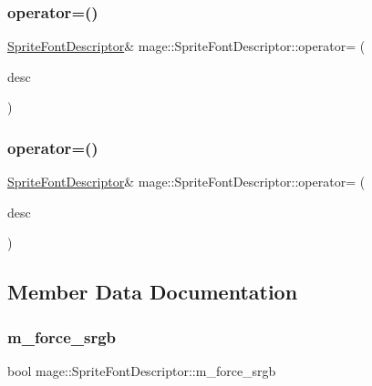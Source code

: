 \hypertarget{structmage_1_1_sprite_font_descriptor_a2279d65420bd8230a334c4ceb560fcf6}{}\label{structmage_1_1_sprite_font_descriptor_a2279d65420bd8230a334c4ceb560fcf6} 
\subsubsection{\texorpdfstring{operator=()}{operator=()}\hspace{0.1cm}{\footnotesize\ttfamily [1/2]}}
{\footnotesize\ttfamily \hyperlink{structmage_1_1_sprite_font_descriptor}{Sprite\+Font\+Descriptor}\& mage\+::\+Sprite\+Font\+Descriptor\+::operator= (\begin{DoxyParamCaption}\item[{const \hyperlink{structmage_1_1_sprite_font_descriptor}{Sprite\+Font\+Descriptor} \&}]{desc }\end{DoxyParamCaption})\hspace{0.3cm}{\ttfamily [default]}}

\hypertarget{structmage_1_1_sprite_font_descriptor_a4d7c7df43f32819446f35ef71f49ebac}{}\label{structmage_1_1_sprite_font_descriptor_a4d7c7df43f32819446f35ef71f49ebac} 
\subsubsection{\texorpdfstring{operator=()}{operator=()}\hspace{0.1cm}{\footnotesize\ttfamily [2/2]}}
{\footnotesize\ttfamily \hyperlink{structmage_1_1_sprite_font_descriptor}{Sprite\+Font\+Descriptor}\& mage\+::\+Sprite\+Font\+Descriptor\+::operator= (\begin{DoxyParamCaption}\item[{\hyperlink{structmage_1_1_sprite_font_descriptor}{Sprite\+Font\+Descriptor} \&\&}]{desc }\end{DoxyParamCaption})\hspace{0.3cm}{\ttfamily [default]}}



\subsection{Member Data Documentation}
\hypertarget{structmage_1_1_sprite_font_descriptor_a7fa7230004e671127856e2ab1c27c94a}{}\label{structmage_1_1_sprite_font_descriptor_a7fa7230004e671127856e2ab1c27c94a} 
\subsubsection{\texorpdfstring{m\+\_\+force\+\_\+srgb}{m\_force\_srgb}}
{\footnotesize\ttfamily bool mage\+::\+Sprite\+Font\+Descriptor\+::m\+\_\+force\+\_\+srgb\hspace{0.3cm}{\ttfamily [private]}}

